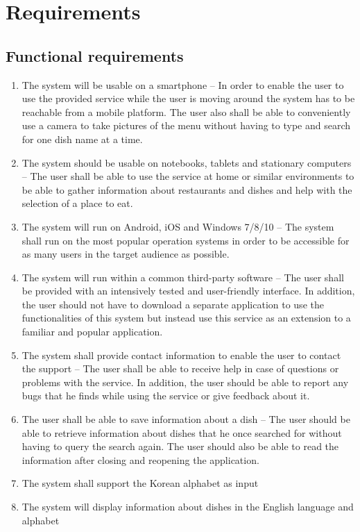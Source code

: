 \section{Requirements}
\subsection{Functional requirements}
\begin{enumerate}[label=A.\arabic*]
\item The system will be usable on a smartphone – In order to enable the user to use the provided service while the user is moving around the system has to be reachable from a mobile platform. The user also shall be able to conveniently use a camera to take pictures of the menu without having to type and search for one dish name at a time.
\item The system should be usable on notebooks, tablets and stationary computers – The user shall be able to use the service at home or similar environments to be able to gather information about restaurants and dishes and help with the selection of a place to eat.
\item The system will run on Android, iOS and Windows 7/8/10 – The system shall run on the most popular operation systems in order to be accessible for as many users in the target audience as possible.
\item The system will run within a common third-party software – The user shall be provided with an intensively tested and user-friendly interface. In addition, the user should not have to download a separate application to use the functionalities of this system but instead use this service as an extension to a familiar and popular application.
\item The system shall provide contact information to enable the user to contact the support – The user shall be able to receive help in case of questions or problems with the service. In addition, the user should be able to report any bugs that he finds while using the service or give feedback about it.
\item The user shall be able to save information about a dish – The user should be able to retrieve information about dishes that he once searched for without having to query the search again. The user should also be able to read the information after closing and reopening the application.
\item The system shall support the Korean alphabet as input
\item The system will display information about dishes in the English language and alphabet

\end{enumerate}
